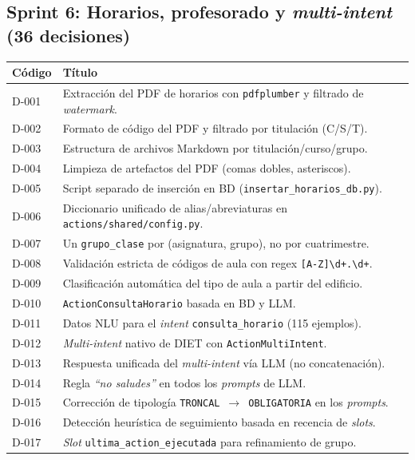 \subsection*{Sprint 6: Horarios, profesorado y \textit{multi-intent} (36 decisiones)}

\begin{longtable}{|p{1.3cm}|>{\raggedright\arraybackslash}p{12cm}|}
\hline
\textbf{Código} & \textbf{Título} \\ \hline
D-001 & Extracción del PDF de horarios con \texttt{pdfplumber} y filtrado de \textit{watermark}. \\ \hline
D-002 & Formato de código del PDF y filtrado por titulación (C/S/T). \\ \hline
D-003 & Estructura de archivos Markdown por titulación/curso/grupo. \\ \hline
D-004 & Limpieza de artefactos del PDF (comas dobles, asteriscos). \\ \hline
D-005 & Script separado de inserción en BD (\texttt{insertar\_horarios\_db.py}). \\ \hline
D-006 & Diccionario unificado de alias/abreviaturas en \texttt{actions/shared/config.py}. \\ \hline
D-007 & Un \texttt{grupo\_clase} por (asignatura, grupo), no por cuatrimestre. \\ \hline
D-008 & Validación estricta de códigos de aula con regex \texttt{[A-Z]\textbackslash d+.\textbackslash d+}. \\ \hline
D-009 & Clasificación automática del tipo de aula a partir del edificio. \\ \hline
D-010 & \texttt{ActionConsultaHorario} basada en BD y LLM. \\ \hline
D-011 & Datos NLU para el \textit{intent} \texttt{consulta\_horario} (115 ejemplos). \\ \hline
D-012 & \textit{Multi-intent} nativo de DIET con \texttt{ActionMultiIntent}. \\ \hline
D-013 & Respuesta unificada del \textit{multi-intent} vía LLM (no concatenación). \\ \hline
D-014 & Regla \textit{``no saludes''} en todos los \textit{prompts} de LLM. \\ \hline
D-015 & Corrección de tipología \texttt{TRONCAL}~$\rightarrow$~\texttt{OBLIGATORIA} en los \textit{prompts}. \\ \hline
D-016 & Detección heurística de seguimiento basada en recencia de \textit{slots}. \\ \hline
D-017 & \textit{Slot} \texttt{ultima\_action\_ejecutada} para refinamiento de grupo. \\ \hline

\end{longtable}
